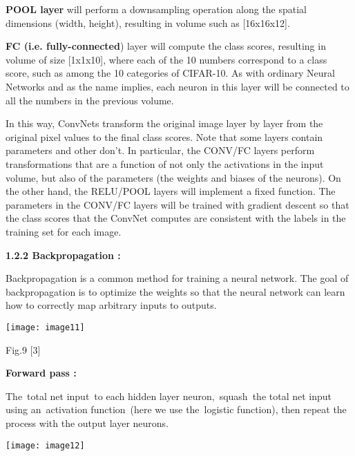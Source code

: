\documentclass{article} %
\begin{document}
\noindent \textbf{POOL layer} will perform a downsampling operation along the spatial dimensions (width, height), resulting in volume such as [16x16x12].

\noindent \textbf{FC (i.e. fully-connected}) layer will compute the class scores, resulting in volume of size [1x1x10], where each of the 10 numbers correspond to a class score, such as among the 10 categories of CIFAR-10. As with ordinary Neural Networks and as the name implies, each neuron in this layer will be connected to all the numbers in the previous volume.

\noindent In this way, ConvNets transform the original image layer by layer from the original pixel values to the final class scores. Note that some layers contain parameters and other don't. In particular, the CONV/FC layers perform transformations that are a function of not only the activations in the input volume, but also of the parameters (the weights and biases of the neurons). On the other hand, the RELU/POOL layers will implement a fixed function. The parameters in the CONV/FC layers will be trained with gradient descent so that the class scores that the ConvNet computes are consistent with the labels in the training set for each image.

\noindent 

\noindent 

\noindent 

\noindent 

\noindent 

\noindent 

\noindent 

\noindent \textbf{1.2.2 Backpropagation :}

\noindent Backpropagation is a common method for training a neural network. The goal of backpropagation is to optimize the weights so that the neural network can learn how to correctly map arbitrary inputs to outputs.

\noindent \texttt{[image: image11]}

\noindent Fig.9  [3]

\noindent \textbf{Forward pass :}

\noindent The~total net input~to each hidden layer neuron,~squash~the total net input using an~activation function~(here we use the~logistic function), then repeat the process with the output layer neurons.

\noindent \texttt{[image: image12]}
\end{document}
